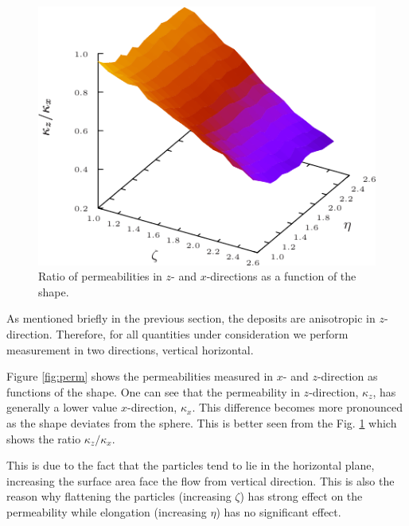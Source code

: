 \documentclass[aps,twocolumn,superscriptaddress,showpacs,showkeys]{revtex4-1}
\begin{document}
\begin{figure}
\begin{center}
\includegraphics*[width=1.0\columnwidth]{data-figs/permeability_ratio}
\caption{\protect
	Ratio of permeabilities in $z$- and $x$-directions as a function of the shape. 
	}
\label{fig:perm_ratio}
\end{center}
\end{figure}
As mentioned briefly in the previous section, the deposits are anisotropic in
$z$-direction.  Therefore, for all quantities under consideration we perform
measurement in two directions, vertical horizontal.

Figure \ref{fig:perm} shows the permeabilities measured in $x$- and
$z$-direction as functions of the shape.  One can see that the permeability in
$z$-direction, $\kappa_z$, has generally a lower value $x$-direction,
$\kappa_x$. This difference becomes more pronounced as the shape deviates from
the sphere. This is better seen from the Fig. \ref{fig:perm_ratio} which shows
the ratio $\kappa_z/\kappa_x$.

This is due to the fact that the particles tend to lie in the horizontal
plane, increasing the surface area face the flow from vertical direction.
This is also the reason why flattening the particles (increasing $\zeta$) has
strong effect on the permeability while elongation (increasing $\eta$) has no
significant effect.
\end{document}
